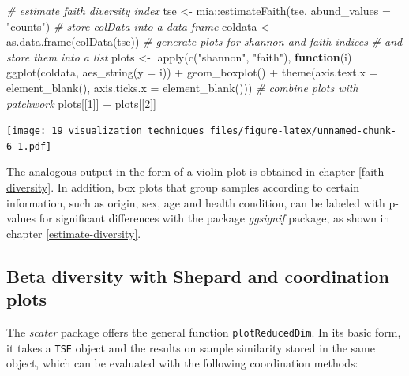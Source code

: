 \documentclass[
]{book}
\newenvironment{Shaded}{\begin{snugshade}}{\end{snugshade}}
\newcommand{\AttributeTok}[1]{\textcolor[rgb]{0.77,0.63,0.00}{#1}}
\newcommand{\CommentTok}[1]{\textcolor[rgb]{0.56,0.35,0.01}{\textit{#1}}}
\newcommand{\ControlFlowTok}[1]{\textcolor[rgb]{0.13,0.29,0.53}{\textbf{#1}}}
\newcommand{\DecValTok}[1]{\textcolor[rgb]{0.00,0.00,0.81}{#1}}
\newcommand{\FunctionTok}[1]{\textcolor[rgb]{0.00,0.00,0.00}{#1}}
\newcommand{\NormalTok}[1]{#1}
\newcommand{\OtherTok}[1]{\textcolor[rgb]{0.56,0.35,0.01}{#1}}
\newcommand{\SpecialCharTok}[1]{\textcolor[rgb]{0.00,0.00,0.00}{#1}}
\newcommand{\StringTok}[1]{\textcolor[rgb]{0.31,0.60,0.02}{#1}}
\begin{document}
\begin{Shaded}
\begin{Highlighting}[]
\CommentTok{\# estimate faith diversity index}
\NormalTok{tse }\OtherTok{\textless{}{-}}\NormalTok{ mia}\SpecialCharTok{::}\FunctionTok{estimateFaith}\NormalTok{(tse,}
                          \AttributeTok{abund\_values =} \StringTok{"counts"}\NormalTok{)}
\CommentTok{\# store colData into a data frame}
\NormalTok{coldata }\OtherTok{\textless{}{-}} \FunctionTok{as.data.frame}\NormalTok{(}\FunctionTok{colData}\NormalTok{(tse))}
\CommentTok{\# generate plots for shannon and faith indices}
\CommentTok{\# and store them into a list}
\NormalTok{plots }\OtherTok{\textless{}{-}} \FunctionTok{lapply}\NormalTok{(}\FunctionTok{c}\NormalTok{(}\StringTok{"shannon"}\NormalTok{, }\StringTok{"faith"}\NormalTok{),}
                \ControlFlowTok{function}\NormalTok{(i) }\FunctionTok{ggplot}\NormalTok{(coldata, }\FunctionTok{aes\_string}\NormalTok{(}\AttributeTok{y =}\NormalTok{ i)) }\SpecialCharTok{+}
                  \FunctionTok{geom\_boxplot}\NormalTok{() }\SpecialCharTok{+}
                  \FunctionTok{theme}\NormalTok{(}\AttributeTok{axis.text.x =} \FunctionTok{element\_blank}\NormalTok{(),}
                        \AttributeTok{axis.ticks.x =} \FunctionTok{element\_blank}\NormalTok{()))}
\CommentTok{\# combine plots with patchwork}
\NormalTok{plots[[}\DecValTok{1}\NormalTok{]] }\SpecialCharTok{+}\NormalTok{ plots[[}\DecValTok{2}\NormalTok{]]}
\end{Highlighting}
\end{Shaded}

\texttt{[image: 19\_visualization\_techniques\_files/figure-latex/unnamed-chunk-6-1.pdf]}

The analogous output in the form of a violin plot is obtained in chapter
\ref{faith-diversity}. In addition, box plots that group samples according to
certain information, such as origin, sex, age and health condition, can be
labeled with p-values for significant differences with the package \emph{ggsignif}
package, as shown in chapter \ref{estimate-diversity}.

\hypertarget{beta-diversity-with-shepard-and-coordination-plots}{%
\subsection{Beta diversity with Shepard and coordination plots}\label{beta-diversity-with-shepard-and-coordination-plots}}

The \emph{scater} package offers the general function \texttt{plotReducedDim}. In its basic
form, it takes a \texttt{TSE} object and the results on sample similarity stored in the
same object, which can be evaluated with the following coordination methods:
\end{document}
